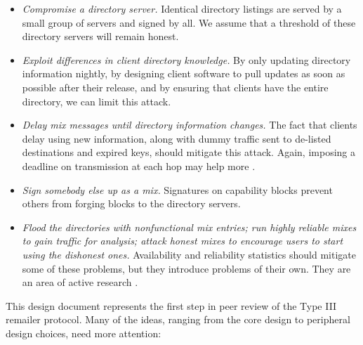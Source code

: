 \documentclass[times,10pt,twocolumn]{article}
\begin{document}
\begin{enumerate}
\begin{itemize}
\item \emph{Compromise a directory server.} Identical directory listings
are served by a small group of servers and signed by all. We assume
that a threshold of these directory servers will remain honest.
\item \emph{Exploit differences in client directory knowledge.} By only
updating directory information nightly, by designing client software to
pull updates as soon as possible after their release, and by ensuring
that clients have the entire directory, we can limit this attack.
\item \emph{Delay mix messages until directory information changes.}
The fact that clients delay using new information, along with dummy
traffic sent to de-listed destinations and expired keys, should mitigate
this attack. Again, imposing a deadline on transmission at each hop
may help more \cite{mix-acc}.
\item \emph{Sign somebody else up as a mix.}  Signatures on capability
blocks prevent others from forging blocks to the directory servers.
\item \emph{Flood the directories with nonfunctional mix entries; run
highly reliable mixes to gain traffic for analysis; attack honest mixes
to encourage users to start using the dishonest ones.}
Availability and reliability statistics should mitigate some of these
problems, but they introduce problems of their own. They are an area of
active research \cite{mix-acc,casc-rep}.
\end{itemize}
\end{enumerate}


\label{sec:conclusion}

This design document represents the first step in peer review of the
Type III remailer protocol. Many of the ideas, ranging from the core
design to peripheral design choices, need more attention:
\end{document}
